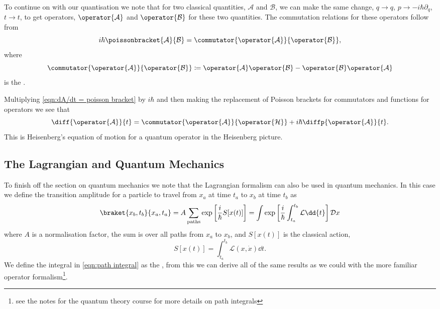 \documentclass[fleqn]{NotesClass}
\newcommand*{\lagrangian}{\mathcal{L}}
\newcommand*{\hamiltonian}{\mathcal{H}}
\newcommand*{\DL}[1]{\mathcal{D}#1}
\begin{document}
    To continue on with our quantisation we note that for two classical quantities, \(\mathcal{A}\) and \(\mathcal{B}\), we can make the same change, \(q \to q\), \(p \to -i\hbar\partial_q\), \(t \to t\), to get operators, \(\operator{\mathcal{A}}\) and \(\operator{\mathcal{B}}\) for these two quantities.
    The commutation relations for these operators follow from
    \begin{equation}
        i\hbar\poissonbracket{\mathcal{A}}{\mathcal{B}} = \commutator{\operator{\mathcal{A}}}{\operator{\mathcal{B}}},
    \end{equation}
    where
    \begin{equation}
        \commutator{\operator{\mathcal{A}}}{\operator{\mathcal{B}}} \coloneqq \operator{\mathcal{A}}\operator{\mathcal{B}} - \operator{\mathcal{B}}\operator{\mathcal{A}}
    \end{equation}
    is the .
    
    Multiplying \cref{eqn:dA/dt = poisson bracket} by \(i\hbar\) and then making the replacement of Poisson brackets for commutators and functions for operators we see that
    \begin{equation}
        \diff{\operator{\mathcal{A}}}{t} = \commutator{\operator{\mathcal{A}}}{\operator{\hamiltonian}} + i\hbar \diffp{\operator{\mathcal{A}}}{t}.
    \end{equation}
    This is Heisenberg's equation of motion for a quantum operator in the Heisenberg picture.
    
    \subsection{The Lagrangian and Quantum Mechanics}
    To finish off the section on quantum mechanics we note that the Lagrangian formalism can also be used in quantum mechanics.
    In this case we define the transition amplitude for a particle to travel from \(x_a\) at time \(t_a\) to \(x_b\) at time \(t_b\) as
    \begin{equation}\label{eqn:path integral}
        \braket{x_b, t_b}{x_a, t_a} = A \sum_{\text{paths}} \exp\left[ \frac{i}{\hbar} S[x(t)] \right] = \int \exp\left[ \frac{i}{\hbar} \int_{t_a}^{t_b} \lagrangian \dd{t} \right] \DL{x}
    \end{equation}
    where \(A\) is a normalisation factor, the sum is over all paths from \(x_a\) to \(x_b\), and \(S[x(t)]\) is the classical action,
    \begin{equation}
        S[x(t)] = \int_{t_a}^{t_b} \lagrangian(x, \dot{x}) \dd{t}.
    \end{equation}
    We define the integral in \cref{eqn:path integral} as the , from this we can derive all of the same results as we could with the more familiar operator formalism\footnote{see the notes for the quantum theory course for more details on path integrals}.
    
\end{document}
